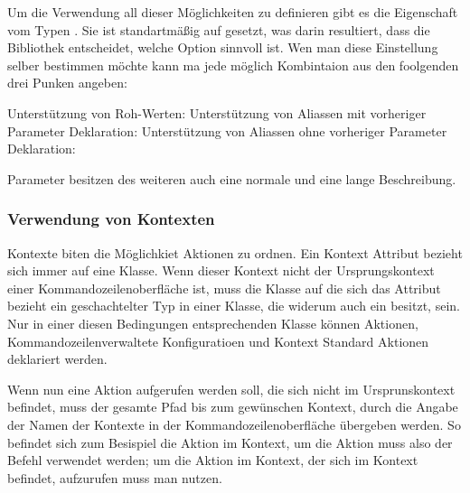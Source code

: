 Um die Verwendung all dieser Möglichkeiten zu definieren gibt es die  Eigenschaft vom Typen .
Sie ist standartmä\ss ig auf  gesetzt, was darin resultiert, dass die Bibliothek entscheidet, welche Option sinnvoll ist.
Wen man diese Einstellung selber bestimmen möchte kann ma jede möglich Kombintaion aus den foolgenden drei Punken angeben:
\begin{outline}
 \1 Unterstützung von Roh-Werten: 
 \1 Unterstützung von Aliassen mit vorheriger Parameter Deklaration: 
 \1 Unterstützung von Aliassen ohne vorheriger Parameter Deklaration: 
\end{outline}

Parameter besitzen des weiteren auch eine normale und eine lange Beschreibung.
\subsubsection{Verwendung von Kontexten}
Kontexte biten die Möglichkiet Aktionen zu ordnen.
Ein Kontext Attribut bezieht sich immer auf eine Klasse.
Wenn dieser Kontext nicht der Ursprungskontext einer Kommandozeilenoberfläche ist, 
muss die Klasse auf die sich das Attribut bezieht ein geschachtelter Typ in einer Klasse, die widerum auch ein  besitzt, sein.
Nur in einer diesen Bedingungen entsprechenden Klasse können Aktionen, Kommandozeilenverwaltete Konfiguratioen und Kontext Standard Aktionen deklariert werden.

Wenn nun eine Aktion aufgerufen werden soll, die sich nicht im Ursprunskontext befindet,
muss der gesamte Pfad bis zum gewünschen Kontext, durch die Angabe der Namen der Kontexte in der Kommandozeilenoberfl\"ache \"ubergeben werden.
So befindet sich zum Besispiel die  Aktion im  Kontext,
um die Aktion muss also der Befehl  verwendet werden;
um die  Aktion im  Kontext, der sich im  Kontext befindet,
aufzurufen muss man  nutzen.

